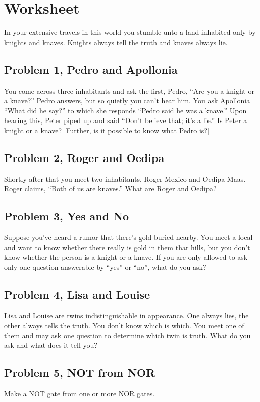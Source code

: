 \documentclass[11pt]{book}
\begin{document}
\newpage
\section{Worksheet}
In your extensive travels in this world you stumble unto a land inhabited only by knights and knaves. Knights always tell the truth and knaves always lie.
\subsection{Problem 1, Pedro and Apollonia}
You come across three inhabitants and ask the first, Pedro, “Are you a knight or a knave?” Pedro answers, but so quietly you can’t hear him. You ask Apollonia “What did he say?” to which she responds “Pedro said he was a knave.” Upon hearing this, Peter piped up and said “Don’t believe that; it’s a lie.” Is Peter a knight or a knave? [Further, is it possible to know what Pedro is?]




\subsection{Problem 2, Roger and Oedipa} 
Shortly after that you meet two inhabitants, Roger Mexico and Oedipa Maas. Roger claims, “Both of us are knaves.” What are Roger and Oedipa?


 
\subsection{Problem 3, Yes and No} 
Suppose you’ve heard a rumor that there’s gold buried nearby. You meet a local and want to know whether there really is gold in them thar hills, but you don’t know whether the person is a knight or a knave. If you are only allowed to ask only one question answerable by ``yes'' or ``no'', what do you ask?


\subsection{Problem 4, Lisa and Louise}
Lisa and Louise are twins indistinguishable in appearance. One always lies, the other always tells the truth. You don’t know which is which. You meet one of them and may ask one question to determine which twin is truth. What do you ask and what does it tell you?

\newpage

\subsection{Problem 5, NOT from NOR}
Make a NOT gate from one or more NOR gates.
\end{document}
